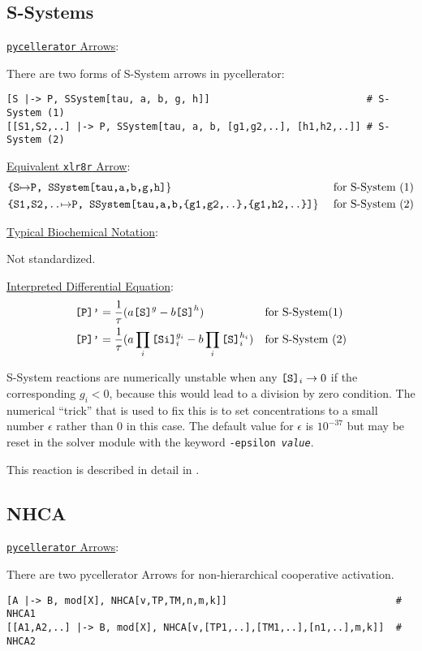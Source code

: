 \subsection{S-Systems}
\label{section:SSystem}
\underline{{\tt pycellerator} Arrows}:

There are two forms of S-System arrows in pycellerator:

\begin{lstlisting}
[S |-> P, SSystem[tau, a, b, g, h]]                           # S-System (1)
[[S1,S2,..] |-> P, SSystem[tau, a, b, [g1,g2,..], [h1,h2,..]] # S-System (2)
\end{lstlisting}


\underline{Equivalent {\tt xlr8r} Arrow}: 
\begin{align*}
&\text{\tt{\{S}}{\mapsto}\text{\tt{P, }} \text{\tt{SSystem[tau,a,b,g,h]}}\} & \text{for S-System (1)}\\
&\text{\tt{\{S1,S2,..}}{\mapsto}\text{\tt{P, }} \text{\tt{SSystem[tau,a,b,\{g1,g2,..\},\{g1,h2,..\}]}}\}&\text{
for S-System (2)}
\end{align*}



\underline{Typical Biochemical Notation}: 

Not standardized.

\underline{Interpreted Differential Equation}:
\begin{align}
&\text{\tt{[P]'}}=\dfrac{1}{\tau}(a\text{\tt{[S]}}^g-b\text{\tt{[S]}}^h)&\text{for S-System(1) }\\
&\text{\tt{[P]'}}=\dfrac{1}{\tau}(a\prod_i\text{\tt{[Si]}}_i^{g_i}-b\prod_i\text{\tt{[S]}}_i^{h_i})&\text{for S-System (2)}
\end{align}

S-System reactions are numerically unstable when any $\text{\tt{[S]}}_i\to 0$ if the corresponding $g_i < 0$, because this would lead to a division by zero condition. The numerical ``trick'' that is used to fix this is to set concentrations to a small number $\epsilon$ rather than $0$ in this case. The default value for $\epsilon$ is $10^{-37}$ but may be reset in the solver module with the keyword {\tt -epsilon \textit{value}}. 

This reaction is described in detail in \cite{SSYS1, SSYS2}.

\subsection{NHCA}
\label{section:NHCA}
\underline{{\tt pycellerator} Arrows}:

There are two pycellerator Arrows for non-hierarchical cooperative activation.
\begin{lstlisting}
[A |-> B, mod[X], NHCA[v,TP,TM,n,m,k]]                             # NHCA1 
[[A1,A2,..] |-> B, mod[X], NHCA[v,[TP1,..],[TM1,..],[n1,..],m,k]]  # NHCA2
\end{lstlisting}


